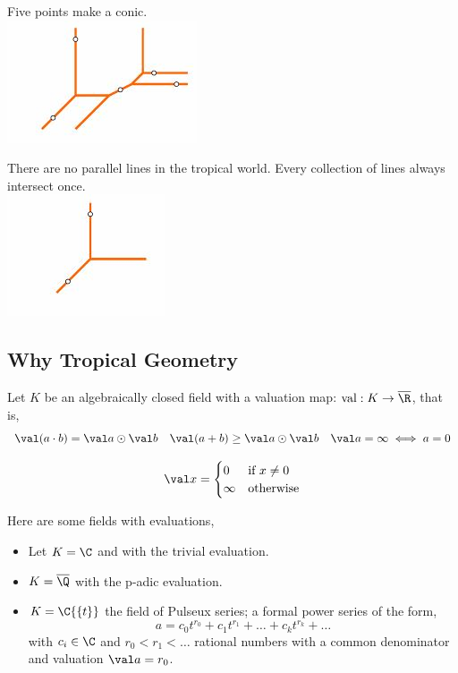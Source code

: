 \documentclass{article}
\begin{document}
\begin{minipage}{0.48\textwidth}
  Five points make a conic.\\\vspace{30pt}
  \centering
  \includegraphics{./figures/L2.7}
\end{minipage}
\begin{minipage}{0.48\textwidth}
  There are no parallel lines in the tropical world. Every collection of lines always intersect once.\\\vspace{30pt}
  \centering
  \includegraphics{./figures/L2.6}
\end{minipage}

\newpage
\subsection{Why Tropical Geometry}
Let $K$ be an algebraically closed field with a valuation map: $\text{val}: K \to \overline\R$, that is,
$$ \val(a \cdot b) = \val a \odot \val b \quad \val (a + b) \ge \val a \odot \val b \quad \val a = \infty \iff a = 0  $$

\begin{ndefi}
  $$ \val x = \begin{cases}
    0 & \text{if $x\ne 0$ }\\
    \infty & \text{otherwise}
  \end{cases} $$
\end{ndefi}

\begin{eg} Here are some fields with evaluations,\\
  \begin{itemize}
    \item Let $K = \C$ and with the trivial evaluation.
    \item $K = \overline\Q$ with the p-adic evaluation.
    \item $K = \C\{\{t\}\}$ the field of Pulseux series; a formal power series of the form,
    $$ a = c_0t^{r_0} + c_1t^{r_1} + \dots + c_kt^{r_k} + \dots$$
    with $c_i \in \C$ and $r_0 < r_1 < \dots$ rational numbers with a common denominator and valuation $\val a = r_0$.
  \end{itemize}
\end{eg}
\end{document}
